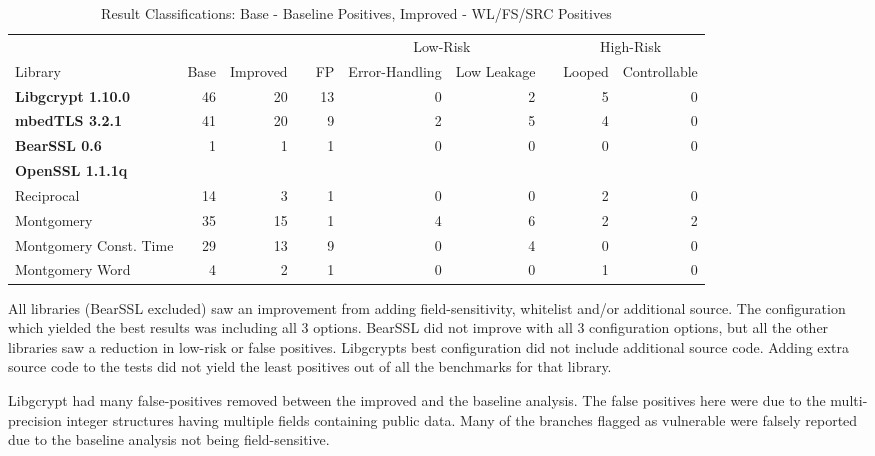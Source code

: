 \begin{table*}[!t]
	\centering
	\begin{tabular}{@{}lrr|crrrcrr@{}}
		\toprule
		&  &  &&  & \multicolumn{2}{c}{Low-Risk} && \multicolumn{2}{c}{High-Risk}\\
		\cmidrule{6-7} \cmidrule{9-10}
		Library& Base & Improved&& FP& Error-Handling & Low Leakage && Looped & Controllable \\
		\midrule
		\textbf{Libgcrypt 1.10.0}& 46 & 20 && 13 &  0  &  2 &&  5 & 0 \\
		\textbf{mbedTLS 3.2.1}  & 41 & 20 && 9 &  2  & 5  && 4   & 0 \\
		\textbf{BearSSL 0.6}    & 1 & 1   && 1 & 0  & 0   &&  0  & 0 \\
		\textbf{OpenSSL 1.1.1q}\\
		\hspace{0.25cm}Reciprocal              & 14 & 3 &&  1    &  0   & 0  &&  2 & 0 \\
		\hspace{0.25cm}Montgomery              & 35 & 15 &&  1    &  4   &  6 &&  2  & 2 \\
		\hspace{0.25cm}Montgomery Const. Time  & 29 & 13 &&  9    &  0  & 4  &&  0   & 0 \\
		\hspace{0.25cm}Montgomery Word         & 4 & 2 &&   1   &   0  & 0  &&   1  & 0 \\
		\bottomrule
	\end{tabular}
	\caption{Result Classifications: Base - Baseline Positives, Improved - WL/FS/SRC
		Positives}
	\label{tbl:allpositives}
\end{table*}


All libraries (BearSSL excluded) saw an improvement from adding
field-sensitivity, whitelist and/or additional source. The configuration which
yielded the best results was including all 3 options. BearSSL did not improve
with all 3 configuration options, but all the other libraries saw a reduction in
low-risk or false positives. Libgcrypts best configuration did not include
additional source code. Adding extra source code to the tests did not yield the
least positives out of all the benchmarks for that library.


Libgcrypt had many false-positives removed between the improved and the baseline
analysis. The false positives here were due to the multi-precision integer
structures having multiple fields containing public data. Many of the branches
flagged as vulnerable were falsely reported due to the baseline analysis not being field-sensitive.

